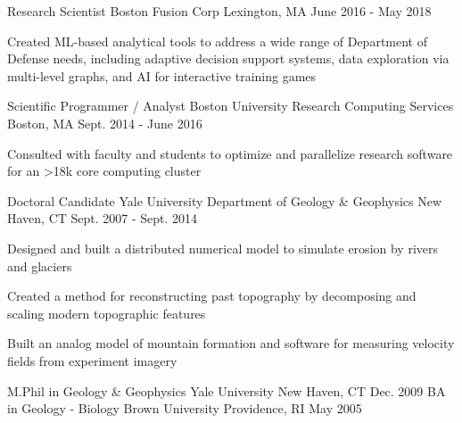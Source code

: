 \documentclass[11pt, a4paper]{awesome-cv}
\begin{document}
\begin{cventries}
  \cventrytight
    {Research Scientist}
    {Boston Fusion Corp}
    {Lexington, MA}
    {June 2016 - May 2018}
    {
      \begin{cvitems}
        \item Created ML-based analytical tools to address a wide range of Department of Defense needs, including adaptive decision support systems, data exploration via multi-level graphs, and AI for interactive training games
      \end{cvitems}
    }

  \cventrytight
    {Scientific Programmer / Analyst}
    {Boston University Research Computing Services}
    {Boston, MA}
    {Sept. 2014 - June 2016}
    {
      \begin{cvitems}
        \item {Consulted with faculty and students to optimize and parallelize research software for an >18k core computing cluster} 
      \end{cvitems}
    }

  \cventrytight
    {Doctoral Candidate}
    {Yale University Department of Geology \& Geophysics}
    {New Haven, CT}
    {Sept. 2007 - Sept. 2014}
    {
      \begin{cvitems}
        \item {Designed and built a distributed numerical model to simulate erosion by rivers and glaciers}
        \item {Created a method for reconstructing past topography by decomposing and scaling modern topographic features}
        \item {Built an analog model of mountain formation and software for measuring velocity fields from experiment imagery}
      \end{cvitems} 
    }

\end{cventries}


\begin{cventries}
  \cventry
    {M.Phil in Geology \& Geophysics}
    {Yale University}
    {New Haven, CT}
    {Dec. 2009}
    {}
  \cventry
    {BA in Geology - Biology}
    {Brown University}
    {Providence, RI}
    {May 2005}
    {}
\end{cventries}
\end{document}
